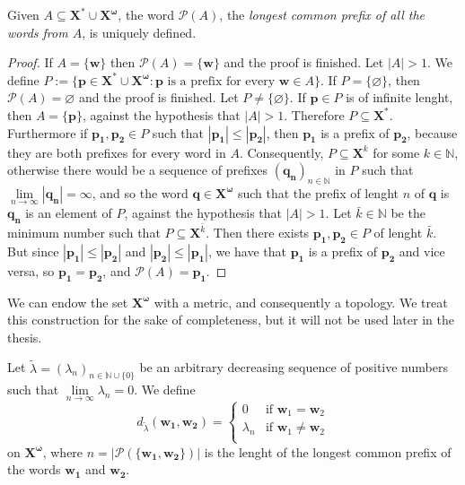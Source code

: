 \documentclass[mat1]{fmfdeloTS2.0}
\newcommand{\N}{\mathbb N}
\newcommand{\obs}{}				%
\newcommand{\word}{\mathbf}				%
\newcommand{\abece}{\mathbf{X}}			%
\newcommand{\fslovar}{\mathbf{X^*}}		%
\newcommand{\infslovar}{\mathbf{X^\omega}}		%
\newcommand{\prefix}{\mathcal{P}}	%
\begin{document}
\begin{proposition}
Given $A \subseteq\fslovar\cup\infslovar$, the word $\prefix(A)$, the \emph{longest common prefix of all the words from $A$}, is uniquely defined.
\end{proposition}
\begin{proof}
If $A=\{\word{w}\}$ then $\prefix(A)=\{\word{w}\}$ and the proof is finished. Let $|A|>1$. We define $P:=\{\word{p}\in\fslovar\cup\infslovar : \word{p} \text{ is a prefix for every }\word{w}\in A\}$. If $P=\{\varnothing\}$, then $\prefix(A)=\varnothing$ and the proof is finished. Let $P\neq\{\varnothing\}$. If $\word{p}\in P$ is of infinite lenght, then $A=\{\word{p}\}$, against the hypothesis that $|A|>1$. Therefore $P\subseteq \fslovar$. Furthermore if $\word{p_1},\word{p_2}\in P$ such that $|\word{p_1}|\leqslant|\word{p_2}|$, then $\word{p_1}$ is a prefix of $\word{p_2}$, because they are both prefixes for every word in $A$. Consequently, $P\subseteq \abece^k$ for some $k\in \N$, otherwise there would be a sequence of prefixes $(\word{q_n})_{n\in\N}$ in $P$ such that $\lim\limits_{n\rightarrow\infty} |\word{q_n}| =\infty$, and so the word $\word{q}\in \infslovar$ such that the prefix of lenght $n$ of $\word{q}$ is $\word{q_n}$ is an element of $P$, against the hypothesis that $|A|>1$. Let $\bar{k}\in\N$ be the minimum number such that $P\subseteq \abece^\bar{k}$. Then there exists $\word{p_1},\word{p_2}\in P$ of lenght $\bar{k}$. But since $|\word{p_1}|\leqslant|\word{p_2}|$ and $|\word{p_2}|\leqslant|\word{p_1}|$, we have that $\word{p_1}$ is a prefix of $\word{p_2}$ and vice versa, so $\word{p_1}=\word{p_2}$, and $\prefix(A)=\word{p_1}$.
\end{proof}


We can endow the set $\infslovar$ with a metric, and consequently a topology. We treat this construction for the sake of completeness, but it will not be used later in the thesis. 

\begin{definition}
Let $\widetilde\lambda=(\lambda_n)_{n\in\N\cup\{0\}}$ be an arbitrary \obs{decreasing} sequence of \obs{positive} numbers such that $\lim\limits_{n\rightarrow\infty} \lambda_n =0$. We define 
\begin{equation}
d_{\widetilde\lambda}(\word{w_1},\word{w_2})=\left\{
\begin{array}{ll}
      0 \;& \text{if }\word{w}_1=\word{w}_2 \\
      \lambda_n  & \text{if }\word{w}_1\neq\word{w}_2 \\
\end{array} 
\right. 
\label{dist infslovar}
\end{equation} 
on $\infslovar$, where $n=|\prefix(\{\word{w_1},\word{w_2}\})|$ is the lenght of the longest common prefix of the words $\word{w_1}$ and $\word{w_2}$. 
\end{definition}
\end{document}
